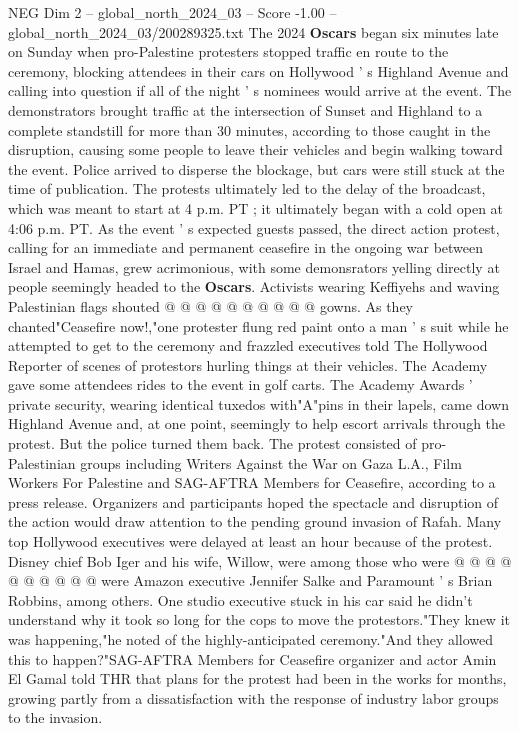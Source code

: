 \begin{textsample}{NEG Dim 2 – global\_north\_2024\_03 – Score -1.00 – global\_north\_2024\_03/200289325.txt}  \label{ex:f2_neg_075}
The 2024 \textbf{Oscars} began six minutes late on Sunday when pro-Palestine protesters stopped traffic en route to the ceremony, blocking attendees in their cars on Hollywood ' s Highland Avenue and calling into question if all of the night ' s nominees would arrive at the event.
The demonstrators brought traffic at the intersection of Sunset and Highland to a complete standstill for more than 30 minutes, according to those caught in the disruption, causing some people to leave their vehicles and begin walking toward the event.
Police arrived to disperse the blockage, but cars were still stuck at the time of publication.
The protests ultimately led to the delay of the broadcast, which was meant to start at 4 p.m.
PT ; it ultimately began with a cold open at 4:06 p.m.
PT.
As the event ' s expected guests passed, the direct action protest, calling for an immediate and permanent ceasefire in the ongoing war between Israel and Hamas, grew acrimonious, with some demonsrators yelling directly at people seemingly headed to the \textbf{Oscars}.
Activists wearing Keffiyehs and waving Palestinian flags shouted @ @ @ @ @ @ @ @ @ @ gowns.
As they chanted"Ceasefire now!,"one protester flung red paint onto a man ' s suit while he attempted to get to the ceremony and frazzled executives told The Hollywood Reporter of scenes of protestors hurling things at their vehicles.
The Academy gave some attendees rides to the event in golf carts.
The Academy Awards ' private security, wearing identical tuxedos with"A"pins in their lapels, came down Highland Avenue and, at one point, seemingly to help escort arrivals through the protest.
But the police turned them back.
The protest consisted of pro-Palestinian groups including Writers Against the War on Gaza L.A., Film Workers For Palestine and SAG-AFTRA Members for Ceasefire, according to a press release.
Organizers and participants hoped the spectacle and disruption of the action would draw attention to the pending ground invasion of Rafah.
Many top Hollywood executives were delayed at least an hour because of the protest.
Disney chief Bob Iger and his wife, Willow, were among those who were @ @ @ @ @ @ @ @ @ @ were Amazon executive Jennifer Salke and Paramount ' s Brian Robbins, among others.
One studio executive stuck in his car said he didn't understand why it took so long for the cops to move the protestors."They knew it was happening,"he noted of the highly-anticipated ceremony."And they allowed this to happen?"SAG-AFTRA Members for Ceasefire organizer and actor Amin El Gamal told THR that plans for the protest had been in the works for months, growing partly from a dissatisfaction with the response of industry labor groups to the invasion.

\end{textsample}
